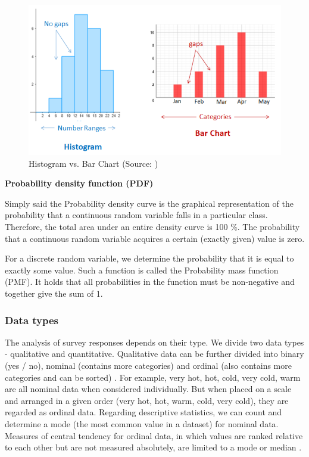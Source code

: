 \documentclass[a4paper,10pt,twoside]{article}
\begin{document}
\vspace{0.3cm}
\begin{figure}[hbt!]
\begin{center}
\includegraphics[width=12.5cm]{../pictures/histogram_barchart.png}
\caption[Histogram vs. Bar Chart (boxplot)]{Histogram vs. Bar Chart (Source: \cite{OnlineMathLearning})}
\label{fig:histogram_barchart}
\end{center}
\end{figure}

\bigskip
\noindent \textbf {Probability density function (PDF)}

\noindent Simply said the Probability density curve is the graphical
representation of the probability that a continuous random variable
falls in a particular class. Therefore, the total area under an entire
density curve is 100 \%. The probability that a continuous random
variable acquires a certain (exactly given) value is zero.

For a discrete random variable, we determine the probability that it
is equal to exactly some value. Such a function is called the
Probability mass function (PMF). It holds that all probabilities in
the function must be non-negative and together give the sum of 1.

\newpage
\vspace*{-1cm}
\subsubsection{Data types}

The analysis of survey responses depends on their type. We divide two
data types - qualitative and quantitative. Qualitative data can be
further divided into binary (yes / no), nominal (contains more
categories) and ordinal (also contains more categories and can be
sorted) \cite{minitab}. For example, very hot, hot, cold, very cold,
warm are all nominal data when considered individually. But when
placed on a scale and arranged in a given order (very hot, hot, warm,
cold, very cold), they are regarded as ordinal data. Regarding
descriptive statistics, we can count and determine a mode (the most
common value in a dataset) for nominal data. Measures of central
tendency for ordinal data, in which values are ranked relative to each
other but are not measured absolutely, are limited to a mode or median
\cite{ordinaldata}.
\end{document}
